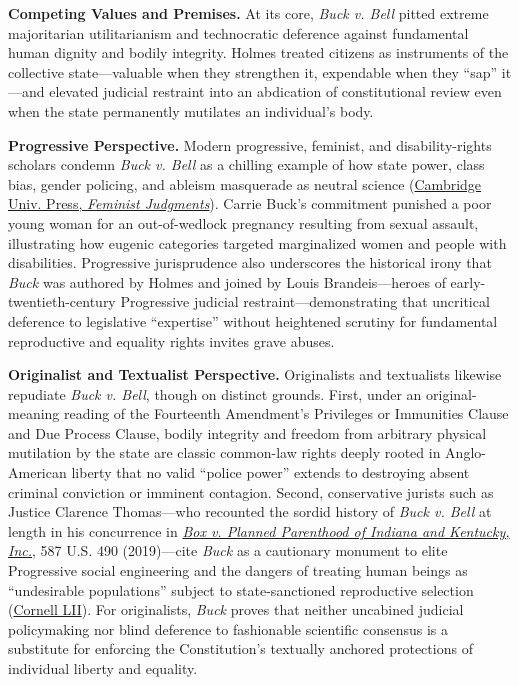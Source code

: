 \documentclass[12pt]{article}
\begin{document}
\textbf{Competing Values and Premises.} At its core, \textit{Buck v. Bell} pitted extreme majoritarian utilitarianism and technocratic deference against fundamental human dignity and bodily integrity. Holmes treated citizens as instruments of the collective state---valuable when they strengthen it, expendable when they ``sap'' it---and elevated judicial restraint into an abdication of constitutional review even when the state permanently mutilates an individual's body.

\textbf{Progressive Perspective.} Modern progressive, feminist, and disability-rights scholars condemn \textit{Buck v. Bell} as a chilling example of how state power, class bias, gender policing, and ableism masquerade as neutral science (\href{https://www.cambridge.org/core/books/feminist-judgments-reproductive-justice-rewritten/buck-v-bell-274-us-200-1927/AFDA01C302E0A630A86607743D21ED3F}{Cambridge Univ. Press, \textit{Feminist Judgments}}). Carrie Buck's commitment punished a poor young woman for an out-of-wedlock pregnancy resulting from sexual assault, illustrating how eugenic categories targeted marginalized women and people with disabilities. Progressive jurisprudence also underscores the historical irony that \textit{Buck} was authored by Holmes and joined by Louis Brandeis---heroes of early-twentieth-century Progressive judicial restraint---demonstrating that uncritical deference to legislative ``expertise'' without heightened scrutiny for fundamental reproductive and equality rights invites grave abuses.

\textbf{Originalist and Textualist Perspective.} Originalists and textualists likewise repudiate \textit{Buck v. Bell}, though on distinct grounds. First, under an original-meaning reading of the Fourteenth Amendment's Privileges or Immunities Clause and Due Process Clause, bodily integrity and freedom from arbitrary physical mutilation by the state are classic common-law rights deeply rooted in Anglo-American liberty that no valid ``police power'' extends to destroying absent criminal conviction or imminent contagion. Second, conservative jurists such as Justice Clarence Thomas---who recounted the sordid history of \textit{Buck v. Bell} at length in his concurrence in \href{https://www.supremecourt.gov/opinions/18pdf/18-483_3d9g.pdf}{\textit{Box v. Planned Parenthood of Indiana and Kentucky, Inc.}}, 587 U.S. 490 (2019)---cite \textit{Buck} as a cautionary monument to elite Progressive social engineering and the dangers of treating human beings as ``undesirable populations'' subject to state-sanctioned reproductive selection (\href{https://www.law.cornell.edu/supremecourt/text/18-483}{Cornell LII}). For originalists, \textit{Buck} proves that neither uncabined judicial policymaking nor blind deference to fashionable scientific consensus is a substitute for enforcing the Constitution's textually anchored protections of individual liberty and equality.
\end{document}
